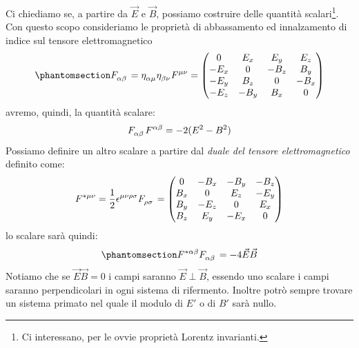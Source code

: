 Ci chiediamo se, a partire da $\Vec{E}$ e $\Vec{B}$, possiamo costruire delle quantità scalari\footnote{Ci interessano, per le ovvie proprietà Lorentz invarianti.}.
Con questo scopo consideriamo le proprietà di abbassamento ed innalzamento di indice sul tensore elettromagnetico
\begin{equation}\phantomsection\label{eq:scalar_mod}
F\indices{_{\alpha\beta}}=\eta\indices{_{\alpha\mu}} \eta\indices{_{\beta\nu}}F\indices{^{\mu\nu}}=
\begin{pmatrix}
  0 & E_x & E_y & E_z  \\
  -E_x & 0 & -B_z & B_y  \\
  -E_y & B_z & 0 & -B_x  \\
  -E_z & -B_y & B_x & 0
\end{pmatrix}
\end{equation}
avremo, quindi, la quantità scalare:
\begin{equation}
    F\indices{_{\alpha\beta}}F\indices{^{\alpha\beta}}=-2(E^2-B^2)
    \end{equation}
Possiamo definire un altro scalare a partire dal \textit{duale del tensore elettromagnetico} definito come:
\begin{equation}
    F\indices{^{*\mu\nu}}=\dfrac{1}{2}\epsilon\indices{^{\mu\nu\rho\sigma}} F\indices{_{\rho\sigma}}=\begin{pmatrix}
  0 & -B_x & -B_y & -B_z  \\
  B_x & 0 & E_z & -E_y  \\
  B_y & -E_z & 0 & E_x  \\
  B_z & E_y & -E_x & 0
\end{pmatrix}
\end{equation}
lo scalare sarà quindi:
\begin{equation}\phantomsection\label{eq:scalar_prod}
    F\indices{^{*\alpha\beta}}F\indices{_{\alpha\beta}}=-4\Vec{E}\Vec{B}
    \end{equation}
    Notiamo che se $\Vec{E}\Vec{B}=0$ i campi saranno $\Vec{E}\perp\Vec{B}$, essendo uno scalare i campi saranno perpendicolari in ogni sistema di rifermento. Inoltre potrò sempre trovare un sistema primato nel quale il modulo di $E'$ o di $B'$ sarà nullo.

